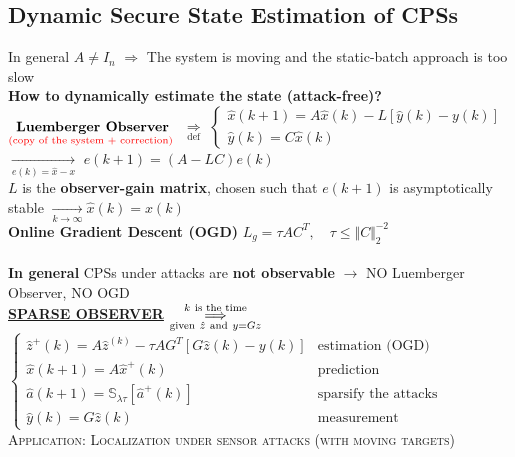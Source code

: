 \documentclass[a4paper, 12pt]{article}
\begin{document}
{\color{red} \subsection*{Dynamic Secure State Estimation of CPSs \quad{}}}
\noindent
In general {\large{$A\ne I_n$}} $\Longrightarrow$ The system is moving and the static-batch approach is too slow\\
{\color{blue}\textbf{How to dynamically estimate the state (attack-free)?} }
\\ $\underset{\color{red}\text{(copy of the system + correction) }}{\textbf{Luemberger Observer}}$ $\underset{\text{def}}{\Longrightarrow}$ $\begin{cases}
    \hat{x}(k+1)=A\hat{x}(k)-L[\hat{y}(k)-y(k)]\\
    \hat{y}(k)=C\hat{x}(k)
\end{cases}$ $\underset{e(k)=\hat{x}-x}{\longrightarrow}$  $e(k+1)=(A-LC)e(k)$\\
$L$ is the \textbf{observer-gain matrix}, chosen such that $e(k+1)$ is asymptotically stable $\underset{k\to\infty}{\longrightarrow} \hat{x}(k)=x(k)$\\
\textbf{Online Gradient Descent (OGD)}  $L_g=\tau AC^T, \quad \tau \le \Vert C \Vert_2^{-2}$\\

\vspace{-0.3cm}\noindent
{}\\
\textbf{In general} CPSs under attacks are \textbf{not observable} $\longrightarrow$ NO Luemberger Observer, NO OGD\\

\vspace{-0.1cm}
\noindent
\underline{\textbf{SPARSE OBSERVER}} $\overunderset{k \ \text{is the time}}{\text{given} \ \hat{z} \ \text{and}\ y=Gz}{\Longrightarrow}$ $\begin{cases}
    \hat{z}^+(k)=A\hat{z}^(k)-\tau A G^T[G\hat{z}(k)-y(k)] &      \text{estimation (OGD)}\\
    \hat{x}(k+1) = A \hat{x}^{+}(k) & \text{prediction}\\
    \hat{a}(k+1) = \mathbb{S}_{\lambda\tau}[\hat{a}^+(k)] & \text{sparsify the attacks} \\
    \hat{y}(k)=G\hat{z}(k) & \text{measurement}
\end{cases}$\\

\noindent
\textsc{Application: Localization under sensor attacks (with moving targets)}\\
\end{document}
